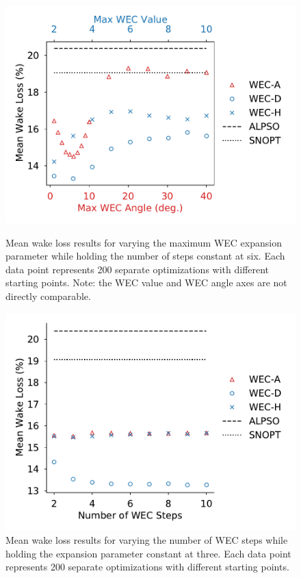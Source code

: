 \documentclass[a4paper]{jpconf}
\begin{document}
\begin{figure}[ht]
	\centering
	\begin{minipage}[t]{0.47\textwidth}
		\centering
		\includegraphics[width=\textwidth, trim={0cm 0cm 0cm 0cm}, clip]{maxwec_const_nsteps6_mean}
		\caption{Mean wake loss results for varying the maximum WEC expansion parameter while holding the number of steps constant at six. Each data point represents 200 separate optimizations with different starting points. Note: the WEC value and WEC angle axes are not directly comparable.}
		\label{fig:aepmean-wm}
	\end{minipage}\hspace{1pc}
	\begin{minipage}[t]{0.47\textwidth}
		\centering
		\includegraphics[width=\textwidth]{nsteps_const_maxwec_mean}
		\caption{Mean wake loss results for varying the number of WEC steps while holding the expansion parameter constant at three. Each data point represents 200 separate optimizations with different starting points.}
		\label{fig:aepmean-ws}
	\end{minipage}
\end{figure}
\end{document}
